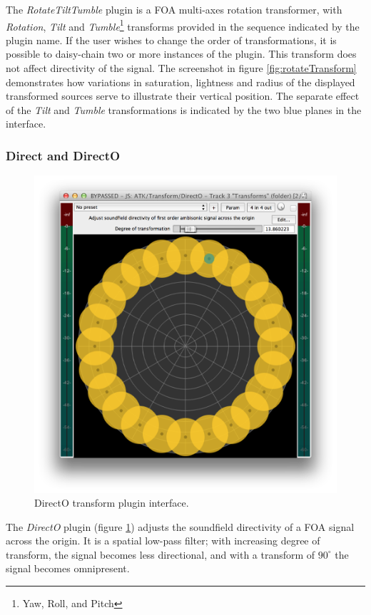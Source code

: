 \documentclass{article}
\begin{document}
The \emph{RotateTiltTumble} plugin is a FOA multi-axes rotation transformer, with \emph{Rotation}, \emph{Tilt} and \emph{Tumble}\footnote{Yaw, Roll, and Pitch} transforms provided in the sequence indicated by the plugin name.
If the user wishes to change the order of transformations, it is possible to daisy-chain two or more instances of the plugin.
This transform does not affect directivity of the signal. The screenshot in figure \ref{fig:rotateTransform} demonstrates how variations in saturation, lightness and radius of the displayed transformed sources serve to illustrate their vertical position.
The separate effect of the \emph{Tilt} and \emph{Tumble} transformations is indicated by the two blue planes in the interface.



\subsubsection{Direct and DirectO}\label{sec:direct}

\begin{figure}[h]
\captionsetup{aboveskip=-6pt}
\centering
\includegraphics[width=0.8\columnwidth]{figures/directOTransform.png}
\caption{DirectO transform plugin interface.\label{fig:directOTransform}}
\end{figure}

The \emph{DirectO} plugin (figure \ref{fig:directOTransform}) adjusts the soundfield directivity of a FOA signal across the origin.
It is a spatial low-pass filter; with increasing degree of transform, the signal becomes less directional, and with a transform of $90^{\circ}$ the signal becomes omnipresent.
  
\end{document}
